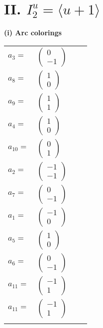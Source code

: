\documentclass[1p]{elsarticle_modified}
\theoremstyle{definition}
\begin{document}
\centering \section*{II. $I^u_{2}= \langle u+1 \rangle$}
\flushleft \textbf{(i) Arc colorings}\\
\begin{tabular}{m{7pt} m{180pt} m{7pt} m{180pt} }
\flushright $a_{3}=$&$\begin{pmatrix}0\\-1\end{pmatrix}$ \\
\flushright $a_{8}=$&$\begin{pmatrix}1\\0\end{pmatrix}$ \\
\flushright $a_{9}=$&$\begin{pmatrix}1\\1\end{pmatrix}$ \\
\flushright $a_{4}=$&$\begin{pmatrix}1\\0\end{pmatrix}$ \\
\flushright $a_{10}=$&$\begin{pmatrix}0\\1\end{pmatrix}$ \\
\flushright $a_{2}=$&$\begin{pmatrix}-1\\-1\end{pmatrix}$ \\
\flushright $a_{7}=$&$\begin{pmatrix}0\\-1\end{pmatrix}$ \\
\flushright $a_{1}=$&$\begin{pmatrix}-1\\0\end{pmatrix}$ \\
\flushright $a_{5}=$&$\begin{pmatrix}1\\0\end{pmatrix}$ \\
\flushright $a_{6}=$&$\begin{pmatrix}0\\-1\end{pmatrix}$ \\
\flushright $a_{11}=$&$\begin{pmatrix}-1\\1\end{pmatrix}$\\ \flushright $a_{11}=$&$\begin{pmatrix}-1\\1\end{pmatrix}$\\&\end{tabular}
\end{document}
